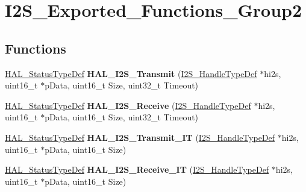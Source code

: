 \hypertarget{group___i2_s___exported___functions___group2}{}\section{I2\+S\+\_\+\+Exported\+\_\+\+Functions\+\_\+\+Group2}
\label{group___i2_s___exported___functions___group2}
\subsection*{Functions}
\begin{DoxyCompactItemize}
\item 
\hyperlink{stm32f4xx__hal__def_8h_a63c0679d1cb8b8c684fbb0632743478f}{H\+A\+L\+\_\+\+Status\+Type\+Def} {\bfseries H\+A\+L\+\_\+\+I2\+S\+\_\+\+Transmit} (\hyperlink{struct_i2_s___handle_type_def}{I2\+S\+\_\+\+Handle\+Type\+Def} $\ast$hi2s, uint16\+\_\+t $\ast$p\+Data, uint16\+\_\+t Size, uint32\+\_\+t Timeout)\hypertarget{group___i2_s___exported___functions___group2_gad53c7444525547c934ee322ca1197dfb}{}\label{group___i2_s___exported___functions___group2_gad53c7444525547c934ee322ca1197dfb}

\item 
\hyperlink{stm32f4xx__hal__def_8h_a63c0679d1cb8b8c684fbb0632743478f}{H\+A\+L\+\_\+\+Status\+Type\+Def} {\bfseries H\+A\+L\+\_\+\+I2\+S\+\_\+\+Receive} (\hyperlink{struct_i2_s___handle_type_def}{I2\+S\+\_\+\+Handle\+Type\+Def} $\ast$hi2s, uint16\+\_\+t $\ast$p\+Data, uint16\+\_\+t Size, uint32\+\_\+t Timeout)\hypertarget{group___i2_s___exported___functions___group2_ga41a95495dff412204cd4c5b631c061ea}{}\label{group___i2_s___exported___functions___group2_ga41a95495dff412204cd4c5b631c061ea}

\item 
\hyperlink{stm32f4xx__hal__def_8h_a63c0679d1cb8b8c684fbb0632743478f}{H\+A\+L\+\_\+\+Status\+Type\+Def} {\bfseries H\+A\+L\+\_\+\+I2\+S\+\_\+\+Transmit\+\_\+\+IT} (\hyperlink{struct_i2_s___handle_type_def}{I2\+S\+\_\+\+Handle\+Type\+Def} $\ast$hi2s, uint16\+\_\+t $\ast$p\+Data, uint16\+\_\+t Size)\hypertarget{group___i2_s___exported___functions___group2_ga476c3a3540e53c0905e80bfb5d309db2}{}\label{group___i2_s___exported___functions___group2_ga476c3a3540e53c0905e80bfb5d309db2}

\item 
\hyperlink{stm32f4xx__hal__def_8h_a63c0679d1cb8b8c684fbb0632743478f}{H\+A\+L\+\_\+\+Status\+Type\+Def} {\bfseries H\+A\+L\+\_\+\+I2\+S\+\_\+\+Receive\+\_\+\+IT} (\hyperlink{struct_i2_s___handle_type_def}{I2\+S\+\_\+\+Handle\+Type\+Def} $\ast$hi2s, uint16\+\_\+t $\ast$p\+Data, uint16\+\_\+t Size)\hypertarget{group___i2_s___exported___functions___group2_ga0018752e02b7221625aca82b532b5864}{}\label{group___i2_s___exported___functions___group2_ga0018752e02b7221625aca82b532b5864}


\end{DoxyCompactItemize}
